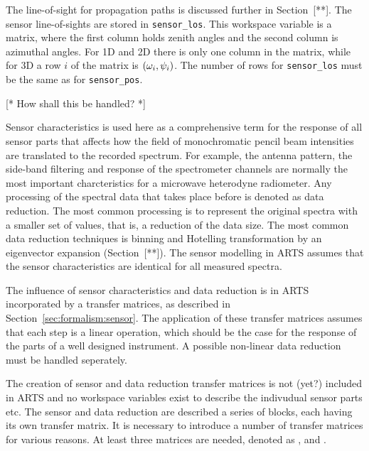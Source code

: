 The line-of-sight for propagation paths is discussed further in
Section~[**]. The sensor line-of-sights are stored in
\verb|sensor_los|. This workspace variable is a matrix, where the
first column holds zenith angles and the second column is azimuthal
angles. For 1D and 2D there is only one column in the matrix, while
for 3D a row $i$ of the matrix is $(\omega_{i},\psi_{i})$. The
number of rows for \verb|sensor_los| must be the same as for
\verb|sensor_pos|.


\label{sec:fm_defs:sensorpol}

[* How shall this be handled? *]


\label{sec:fm_defs:sensorchar}

Sensor characteristics is used here as a comprehensive term for the
response of all sensor parts that affects how the field of
monochromatic pencil beam intensities are translated to the recorded
spectrum. For example, the antenna pattern, the side-band filtering
and response of the spectrometer channels are normally the most
important charcteristics for a microwave heterodyne radiometer. Any
processing of the spectral data that takes place before is denoted as
data reduction. The most common processing is to represent the
original spectra with a smaller set of values, that is, a reduction of
the data size. The most common data reduction techniques is binning
and Hotelling transformation by an eigenvector expansion
(Section~[**]). The sensor modelling in ARTS assumes that the sensor
characteristics are identical for all measured spectra.

The influence of sensor characteristics and data reduction is in ARTS
incorporated by a transfer matrices, as described in
Section~\ref{sec:formalism:sensor}. The application of these transfer
matrices assumes that each step is a linear operation, which should be
the case for the response of the parts of a well designed instrument.
A possible non-linear data reduction must be handled seperately.

The creation of sensor and data reduction transfer matrices is not
(yet?) included in ARTS and no workspace variables exist to describe
the indivudual sensor parts etc. The sensor and data reduction are
described a series of blocks, each having its own transfer matrix.  It
is necessary to introduce a number of transfer matrices for various
reasons. At least three matrices are needed, denoted as ,
 and .




